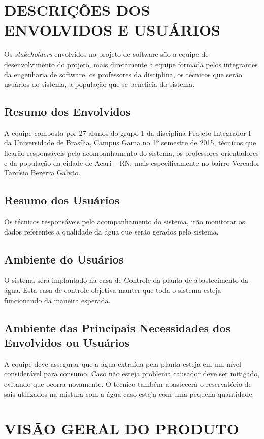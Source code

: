\section*{DESCRIÇÕES DOS ENVOLVIDOS E USUÁRIOS}
Os \emph{stakeholders} envolvidos no projeto de software são a equipe de desenvolvimento do projeto, mais diretamente a equipe formada pelos integrantes da engenharia de software, os professores da disciplina, os técnicos que serão usuários do sistema, a população que se beneficia do sistema.

\subsection*{Resumo dos Envolvidos}
A equipe composta por 27 alunos do grupo 1 da disciplina Projeto Integrador I da Universidade de Brasília, Campus Gama no 1º semestre de 2015, técnicos que ficarão responsáveis pelo acompanhamento do sistema, os professores orientadores e da população da cidade de Acarí – RN, mais especificamente no bairro Vereador Tarcísio Bezerra Galvão.

\subsection*{Resumo dos Usuários}
Os técnicos responsáveis pelo acompanhamento do sistema, irão monitorar os dados referentes a qualidade da água que serão gerados pelo sistema.

\subsection*{Ambiente do Usuários}
O sistema será implantado na casa  de Controle da planta de abastecimento da água. Esta casa de controle objetiva manter que toda o sistema esteja funcionando da maneira esperada.

\subsection*{Ambiente das Principais Necessidades dos Envolvidos ou Usuários}
A equipe deve assegurar que a água extraída pela planta esteja em um nível considerável para consumo. Caso não esteja problema causador deve ser mitigado, evitando que ocorra novamente. O técnico também abastecerá o reservatório de sais utilizados na mistura com a água caso esteja com uma pequena quantidade.

\section*{VISÃO GERAL DO PRODUTO}
